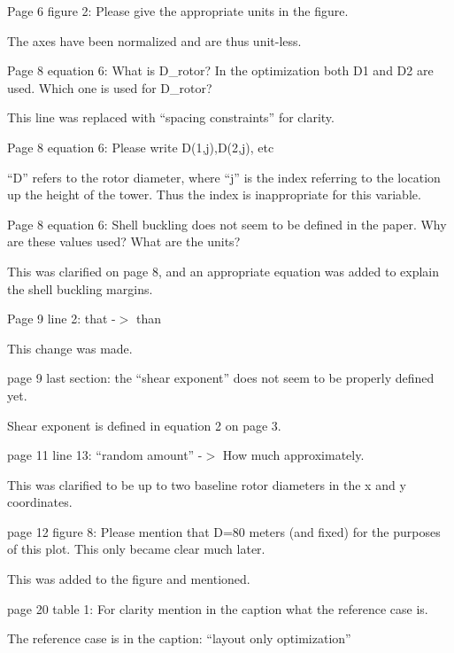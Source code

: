 \documentclass[12pt]{report}
\begin{document}
\bigskip \color{black}
Page 6 figure 2: Please give the appropriate units in the figure.

\color{blue} The axes have been normalized and are thus unit-less.

\bigskip \color{black}
Page 8 equation 6: What is D\_rotor? In the optimization both D1 and D2 are used. Which one is used for D\_rotor?

\color{blue} This line was replaced with ``spacing constraints'' for clarity.

\bigskip \color{black}
Page 8 equation 6: Please write D(1,j),D(2,j), etc

\color{blue} ``D'' refers to the rotor diameter, where ``j'' is the index referring to the location up the height of the tower. Thus the index is inappropriate for this variable.

\bigskip \color{black}
Page 8 equation 6: Shell buckling does not seem to be defined in the paper. Why are these values used? What are the units?

\color{blue} This was clarified on page 8, and an appropriate equation was added to explain the shell buckling margins.

\bigskip \color{black}
Page 9 line 2: that -$>$ than

\color{blue} This change was made.

\bigskip \color{black}
page 9 last section: the ``shear exponent'' does not seem to be properly defined yet.

\color{blue} Shear exponent is defined in equation 2 on page 3.

\bigskip \color{black}
page 11 line 13: ``random amount'' -$>$ How much approximately.

\color{blue} This was clarified to be up to two baseline rotor diameters in the x and y coordinates.

\bigskip \color{black}
page 12 figure 8: Please mention that D=80 meters (and fixed) for the purposes of this plot. This only became clear much later.

\color{blue} This was added to the figure and mentioned.

\bigskip \color{black}
page 20 table 1: For clarity mention in the caption what the reference case is.

\color{blue} The reference case is in the caption: ``layout only optimization''
\end{document}
